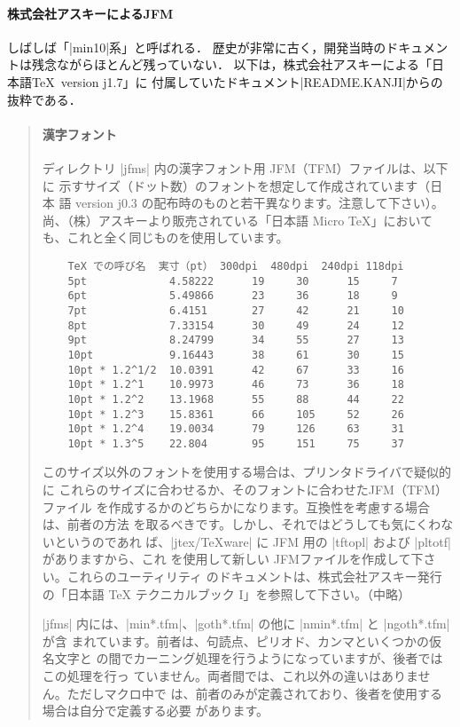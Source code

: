 \documentclass[a4paper,11pt,nomag]{jsarticle}
\begin{document}
\paragraph{株式会社アスキーによるJFM}

しばしば「|min10|系」と呼ばれる．
歴史が非常に古く，開発当時のドキュメントは残念ながらほとんど残っていない．
以下は，株式会社アスキーによる「日本語\TeX\ version j1.7」\cite{jtex1.7}に
付属していたドキュメント|README.KANJI|からの抜粋である．

\begin{quotation}
\paragraph{漢字フォント}

ディレクトリ |jfms| 内の漢字フォント用 JFM（TFM）ファイルは、以下に
示すサイズ（ドット数）のフォントを想定して作成されています（日本
語 version j0.3 の配布時のものと若干異なります。注意して下さい）。
尚、（株）アスキーより販売されている「日本語 Micro TeX」において
も、これと全く同じものを使用しています。

\begin{verbatim}
    TeX での呼び名  実寸（pt） 300dpi  480dpi  240dpi 118dpi
    5pt             4.58222      19     30      15     7
    6pt             5.49866      23     36      18     9
    7pt             6.4151       27     42      21     10
    8pt             7.33154      30     49      24     12
    9pt             8.24799      34     55      27     13
    10pt            9.16443      38     61      30     15
    10pt * 1.2^1/2  10.0391      42     67      33     16
    10pt * 1.2^1    10.9973      46     73      36     18
    10pt * 1.2^2    13.1968      55     88      44     22
    10pt * 1.2^3    15.8361      66     105     52     26
    10pt * 1.2^4    19.0034      79     126     63     31
    10pt * 1.3^5    22.804       95     151     75     37
\end{verbatim}

このサイズ以外のフォントを使用する場合は、プリンタドライバで疑似的に
これらのサイズに合わせるか、そのフォントに合わせたJFM（TFM）ファイル
を作成するかのどちらかになります。互換性を考慮する場合は、前者の方法
を取るべきです。しかし、それではどうしても気にくわないというのであれ
ば、|jtex/TeXware| に JFM 用の |tftopl| および |pltotf| がありますから、これ
を使用して新しい JFMファイルを作成して下さい。これらのユーティリティ
のドキュメントは、株式会社アスキー発行の「日本語 TeX テクニカルブック
I」を参照して下さい。（中略）

|jfms| 内には、|min*.tfm|、|goth*.tfm| の他に |nmin*.tfm| と |ngoth*.tfm| が含
まれています。前者は、句読点、ピリオド、カンマといくつかの仮名文字と
の間でカーニング処理を行うようになっていますが、後者ではこの処理を行っ
ていません。両者間では、これ以外の違いはありません。ただしマクロ中で
は、前者のみが定義されており、後者を使用する場合は自分で定義する必要
があります。
\end{quotation}
\end{document}
